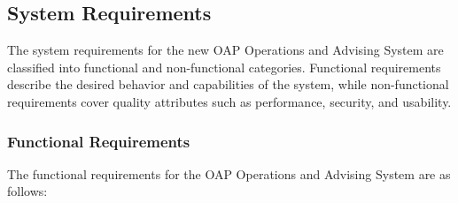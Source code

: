 \documentclass[12pt]{article}
\begin{document}
\subsection{System Requirements}
The system requirements for the new OAP Operations and Advising System are classified into functional and non-functional categories. Functional requirements describe the desired behavior and capabilities of the system, while non-functional requirements cover quality attributes such as performance, security, and usability.

\subsubsection{Functional Requirements}
The functional requirements for the OAP Operations and Advising System are as follows:
\end{document}
